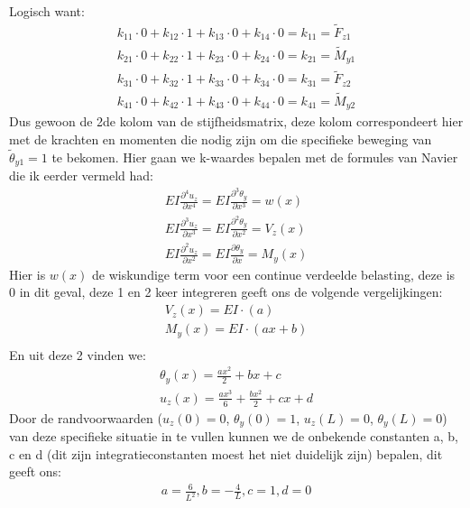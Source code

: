 \documentclass[a4paper,11pt,twoside]{report}
\begin{document}
Logisch want:
\begin{align*}
    k_{11} \cdot 0 + k_{12} \cdot 1 + k_{13} \cdot 0 + k_{14} \cdot 0 = k_{11} = \tilde{F}_{z1} \\
    k_{21} \cdot 0 + k_{22} \cdot 1 + k_{23} \cdot 0 + k_{24} \cdot 0 = k_{21} = \tilde{M}_{y1} \\
    k_{31} \cdot 0 + k_{32} \cdot 1 + k_{33} \cdot 0 + k_{34} \cdot 0 = k_{31} = \tilde{F}_{z2} \\
    k_{41} \cdot 0 + k_{42} \cdot 1 + k_{43} \cdot 0 + k_{44} \cdot 0 = k_{41} = \tilde{M}_{y2}
\end{align*}
Dus gewoon de 2de kolom van de stijfheidsmatrix, deze kolom correspondeert hier met de krachten en
momenten die nodig zijn om die specifieke beweging van $\tilde{\theta}_{y1} = 1$ te bekomen.
\newline
\newline
Hier gaan we k-waardes bepalen met de formules van Navier die ik eerder vermeld had:
\begin{align*}
    EI \frac{\partial^4 u_z}{\partial x^4} = EI \frac{\partial^3 \theta_y}{\partial x^3} = w(x)   \\
    EI \frac{\partial^3 u_z}{\partial x^3} = EI \frac{\partial^2 \theta_y}{\partial x^2} = V_z(x) \\
    EI \frac{\partial^2 u_z}{\partial x^2} = EI \frac{\partial \theta_y}{\partial x} = M_y(x)
\end{align*}
Hier is $w(x)$ de wiskundige term voor een continue verdeelde belasting, deze is 0 in dit geval,
deze 1 en 2 keer integreren geeft ons de volgende vergelijkingen:
\begin{align*}
    V_z(x) = EI \cdot (a)      \\
    M_y(x) = EI \cdot (ax + b) \\
\end{align*}
En uit deze 2 vinden we:
\begin{align*}
    \theta_y(x) = \frac{ax^2}{2} + bx + c \\
    u_z(x) = \frac{ax^3}{6} + \frac{bx^2}{2} + cx + d
\end{align*}
Door de randvoorwaarden ($u_z(0) = 0$, $\theta_y(0) = 1$, $u_z(L) = 0$, $\theta_y(L) = 0$) van deze
specifieke situatie in te vullen kunnen we de onbekende constanten a, b, c en d (dit zijn
integratieconstanten moest het niet duidelijk zijn) bepalen, dit geeft ons:
\begin{align*}
    a = \frac{6}{L^2}, b = -\frac{4}{L}, c = 1, d = 0
\end{align*}
\end{document}
